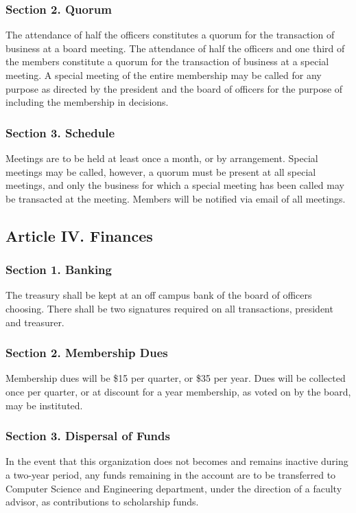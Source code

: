 \documentclass{article}
\begin{document}
    \subsubsection{Section 2. Quorum}
      The attendance of half the officers constitutes a quorum for the transaction of business at a board meeting. The attendance of half the officers and one third of the members constitute a quorum for the transaction of business at a special meeting. A special meeting of the entire membership may be called for any purpose as directed by the president and the board of officers for the purpose of including the membership in decisions.

    \subsubsection{Section 3. Schedule}
      Meetings are to be held at least once a month, or by arrangement. Special meetings may be called, however, a quorum must be present at all special meetings, and only the business for which a special meeting has been called may be transacted at the meeting. Members will be notified via email of all meetings.

  \subsection{Article IV. Finances}

    \subsubsection{Section 1. Banking}
      The treasury shall be kept at an off campus bank of the board of officers choosing. There shall be two signatures required on all transactions, president and treasurer.

    \subsubsection{Section 2. Membership Dues}
      Membership dues will be \$15 per quarter, or \$35 per year. Dues will be collected once per quarter, or at discount for a year membership, as voted on by the board, may be instituted.

    \subsubsection{Section 3. Dispersal of Funds}
      In the event that this organization does not becomes and remains inactive during a two-year period, any funds remaining in the account are to be transferred to Computer Science and Engineering department, under the direction of a faculty advisor, as contributions to scholarship funds.
\end{document}
